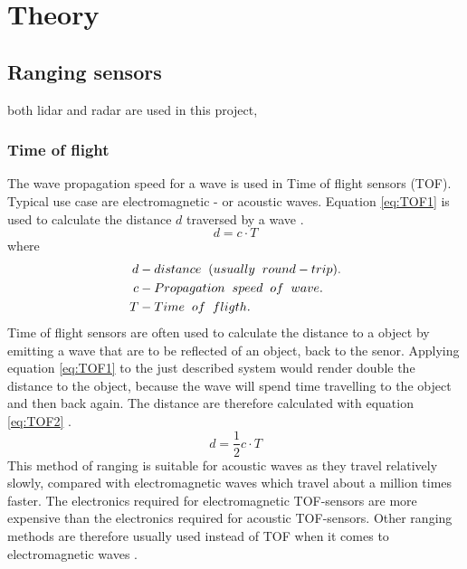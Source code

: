 \chapter{Theory}
\section{Ranging sensors}
both lidar and radar are used in this project, 
\subsection{Time of flight}
The wave propagation speed for a wave is used in Time of flight sensors (TOF). Typical use case are electromagnetic - or acoustic waves. Equation \ref{eq:TOF1} is used to calculate the distance $d$ traversed by a wave \cite{introductionToMobileRobots}.   
\begin{equation} \label{eq:TOF1}
    d = c \cdot T
\end{equation}
where 
\begin{align*} 
d   & - distance \hspace{2mm} (usually \hspace{2mm} round-trip).\\
c   & - Propagation \hspace{2mm} speed \hspace{2mm} of \hspace{2mm} wave. \\
T   & - Time \hspace{2mm} of \hspace{2mm} fligth. \\
\end{align*}  
Time of flight sensors are often used to calculate the distance to a object by emitting a wave that are to be reflected of an object, back to the senor. Applying equation \ref{eq:TOF1} to the just described system would render double the distance to the object, because the wave will spend time travelling to the object and then back again. The distance are therefore calculated with equation \ref{eq:TOF2} \cite{introductionToMobileRobots}.
\begin{equation} \label{eq:TOF2}
    d = \frac{1}{2}c \cdot T
\end{equation}
This method of ranging is suitable for acoustic waves as they travel relatively slowly, compared with electromagnetic waves which travel about a million times faster. The electronics required for electromagnetic TOF-sensors are more expensive than the electronics required for acoustic TOF-sensors. Other ranging methods are therefore usually used instead of TOF when it comes to electromagnetic waves \cite{introductionToMobileRobots}.

